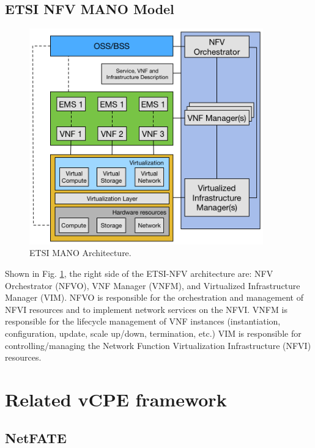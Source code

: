 \subsection{ETSI NFV MANO Model}

\begin{figure}[!t]
\centering
\includegraphics[width=0.9\textwidth]{./fig/etsi_nfv_architecture}
\caption{ETSI MANO Architecture. \cite{etsi-nfv-archi}}
\label{fig:etsi_nfv_architecture}
\end{figure}

Shown in Fig. \ref{fig:etsi_nfv_architecture}, the right side of the ETSI-NFV architecture \cite{etsi-nfv-archi} are: NFV Orchestrator (NFVO), VNF Manager (VNFM), and Virtualized Infrastructure Manager (VIM). NFVO is responsible for the orchestration and management of NFVI resources and to implement network services on the NFVI. VNFM is responsible for the lifecycle management of VNF instances (instantiation, configuration, update, scale up/down, termination, etc.) VIM is responsible for controlling/managing the Network Function Virtualization Infrastructure (NFVI) resources.





\section{Related vCPE framework} \label{sec:related_vcpe}
\subsection{NetFATE}

